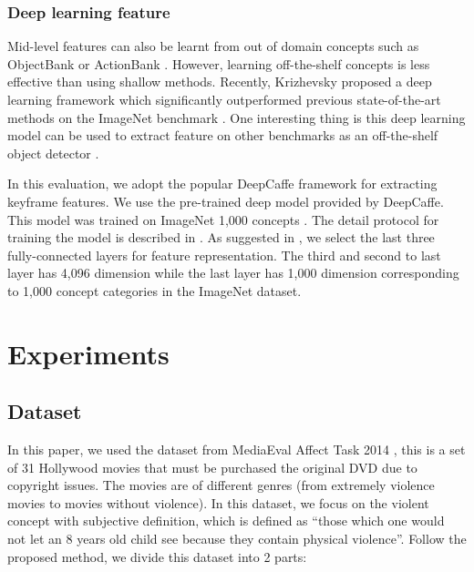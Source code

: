 \documentclass[twocolumn]{bmcart}%
\begin{document}
\subsubsection{Deep learning feature}
Mid-level features can also be learnt from out of domain concepts such as ObjectBank \cite{15} or ActionBank \cite{23}. However, learning off-the-shelf concepts is less effective than using shallow methods. Recently, Krizhevsky \cite{krizhevsky2012imagenet} proposed a deep learning framework which significantly outperformed previous state-of-the-art methods on the ImageNet benchmark \cite{deng2009imagenet}. One interesting thing is this deep learning model can be used to extract feature on other benchmarks as an off-the-shelf object detector \cite{donahue2013decaf}. 

In this evaluation, we adopt the popular DeepCaffe \cite{jia2014caffe} framework for extracting keyframe features. We use the pre-trained deep model provided by DeepCaffe. This model was trained on ImageNet 1,000 concepts \cite{deng2009imagenet}. The detail protocol for training the model is described in \cite{jia2014caffe}. As suggested in \cite{krizhevsky2012imagenet}, we select the last three fully-connected layers for feature representation. The third and second to last layer has 4,096 dimension while the last layer has 1,000 dimension corresponding to 1,000 concept categories in the ImageNet dataset.

\section{Experiments}
\subsection{Dataset}
In this paper, we used the dataset from MediaEval  Affect Task 2014 \cite{demarty2014benchmarking}, this is a set of 31 Hollywood movies that must be purchased the original DVD due to copyright issues. The movies are of different genres (from extremely violence movies to movies without violence). In this dataset, we focus on the violent concept with subjective definition, which is defined as “those which one would not let an 8 years old child see because they contain physical violence”. Follow the proposed method, we divide this dataset into 2 parts:
\end{document}
